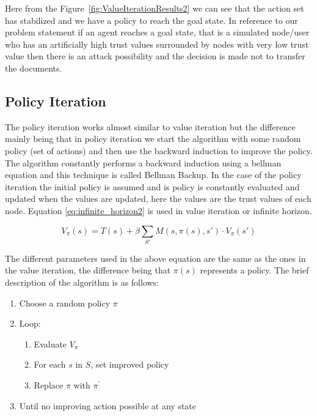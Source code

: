 Here from the Figure~\ref{fig:ValueIterationResults2} we can see that the action set has stabilized and we
have a policy to reach the goal state. In reference to our problem statement if
an agent reaches a goal state, that is a simulated node/user who has an
artificially high trust values surrounded by nodes with very low trust value
then there is an attack possibility and the decision is made not to transfer the
documents.

\subsection{Policy Iteration}

The policy iteration works almost similar to value iteration but the difference
mainly being that in policy iteration we start the algorithm with some random
policy (set of actions) and then use the backward induction to improve the
policy. The algorithm constantly performs a backward induction using a bellman
equation \autocite{Wikipedia2013} and this technique is called Bellman Backup. In the case of the
policy iteration the initial policy is assumed and is policy is constantly
evaluated and updated when the values are updated, here the values are the trust values of each node.  Equation \ref{eq:infinite_horizon2} is used in value iteration
or infinite horizon.

\begin{equation} 
    \label{eq:infinite_horizon2}
    V_\pi(s) = T(s) + \beta \sum_{S'} M(s,\pi(s),s') \cdot V_\pi(s')
\end{equation}


The different parameters used in the above equation are the same as the ones in
the value iteration, the difference being that $\pi(s)$ represents a policy. The brief
description of the algorithm is as follows:
\begin{enumerate}
    \item Choose a random policy $\pi$
    \item Loop: 
        \begin{enumerate}
            \item Evaluate $V_\pi$ 
            \item For each $s$ in $S$, set improved policy
            \item Replace $\pi$ with $\pi^\prime$ 
        \end{enumerate}
        \item Until no improving action possible at any state
\end{enumerate}

